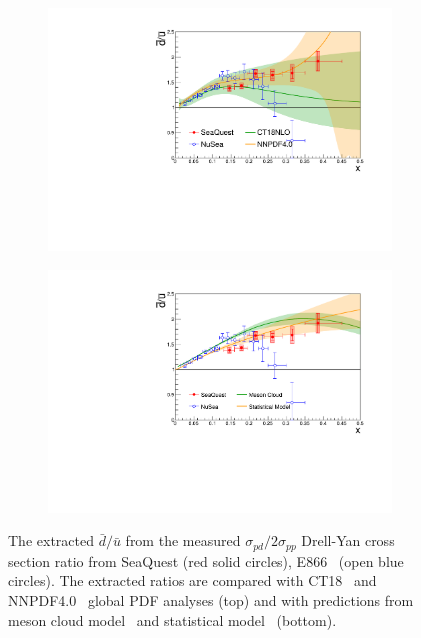 \documentclass[reprint,aps,unsortedaddress,superscriptaddress,prc,floatfix,showpacs,linenumbers]{revtex4-2}
\begin{document}
\begin{figure}[htpb!]
	\centering
	\begin{subfigure}{\linewidth}
		\includegraphics[width=\linewidth]{E906_E866_dbarubar_PDF.pdf}
	\end{subfigure}
	\begin{subfigure}{\linewidth}
		\includegraphics[width=\linewidth]{E906_E866_dbarubar.pdf}
	\end{subfigure}
	\caption{The extracted $\bar{d}/\bar{u}$ from the measured $\sigma_{pd}/2\sigma_{pp}$ Drell-Yan cross section ratio
		from SeaQuest (red solid circles), E866~\cite{towell2001} (open blue circles).
		The extracted ratios are compared with CT18~\cite{hou2021} and NNPDF4.0~\cite{ball2022a} global PDF analyses (top)
		and with predictions from meson cloud model~\cite{alberg2022} and statistical model~\cite{soffer2019} (bottom).}
	\label{fig:e906_e866_dbarubar}
\end{figure}
\end{document}
